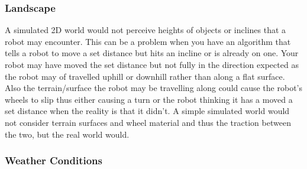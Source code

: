 \documentclass[a4paper,12pt]{article}
\begin{document}
\subsubsection{Landscape}

\noindent A simulated 2D world would not perceive heights of objects or inclines that a robot may encounter. This can be a problem when you have an algorithm that tells a robot to move a set distance but hits an incline or is already on one. Your robot may have moved the set distance but not fully in the direction expected as the robot may of travelled uphill or downhill rather than along a flat surface. Also the terrain/surface the robot may be travelling along could cause the robot's wheels to slip thus either causing a turn or the robot thinking it has a moved a set distance when the reality is that it didn't. A simple simulated world would not consider terrain surfaces and wheel material and thus the traction between the two, but the real world would.

\subsubsection{Weather Conditions}


\vspace{5mm}
\noindent 
\end{document}
